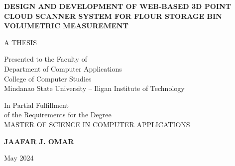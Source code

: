 
\begin{titlepage}
	\setlength{\topmargin}{-40pt}
	\setlength{\textheight}{664pt}
	\begin{singlespace}
		\begin{center}
			\textbf{\MakeUppercase{Design and Development of Web-based 3D Point Cloud Scanner System for Flour Storage Bin Volumetric Measurement}}
			\vspace{3.0cm}

			\MakeUppercase{A THESIS}

			\vspace{3.0cm}

			Presented to the Faculty of\\
			Department of Computer Applications\\
			College of Computer Studies \\
			Mindanao State University -- Iligan Institute of Technology

			\vspace{3.0cm}

			In Partial Fulfillment\\
			of the Requirements for the Degree\\
			MASTER OF SCIENCE IN COMPUTER APPLICATIONS

			\vspace{3.0cm}

			\textbf{JAAFAR J. OMAR}

			\vspace{3.0cm}



			May 2024

		\end{center}
	\end{singlespace}
\end{titlepage}